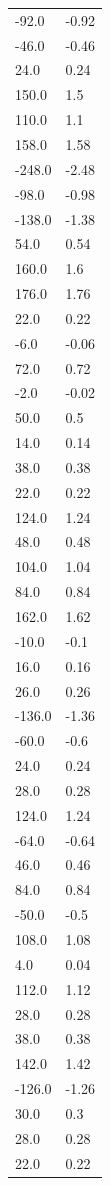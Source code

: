 \begin{longtable}{ll}
-92.0 & -0.92 \\
-46.0 & -0.46 \\
24.0 & 0.24 \\
150.0 & 1.5 \\
110.0 & 1.1 \\
158.0 & 1.58 \\
-248.0 & -2.48 \\
-98.0 & -0.98 \\
-138.0 & -1.38 \\
54.0 & 0.54 \\
160.0 & 1.6 \\
176.0 & 1.76 \\
22.0 & 0.22 \\
-6.0 & -0.06 \\
72.0 & 0.72 \\
-2.0 & -0.02 \\
50.0 & 0.5 \\
14.0 & 0.14 \\
38.0 & 0.38 \\
22.0 & 0.22 \\
124.0 & 1.24 \\
48.0 & 0.48 \\
104.0 & 1.04 \\
84.0 & 0.84 \\
162.0 & 1.62 \\
-10.0 & -0.1 \\
16.0 & 0.16 \\
26.0 & 0.26 \\
-136.0 & -1.36 \\
-60.0 & -0.6 \\
24.0 & 0.24 \\
28.0 & 0.28 \\
124.0 & 1.24 \\
-64.0 & -0.64 \\
46.0 & 0.46 \\
84.0 & 0.84 \\
-50.0 & -0.5 \\
108.0 & 1.08 \\
4.0 & 0.04 \\
112.0 & 1.12 \\
28.0 & 0.28 \\
38.0 & 0.38 \\
142.0 & 1.42 \\
-126.0 & -1.26 \\
30.0 & 0.3 \\
28.0 & 0.28 \\
22.0 & 0.22 \\

\end{longtable}
